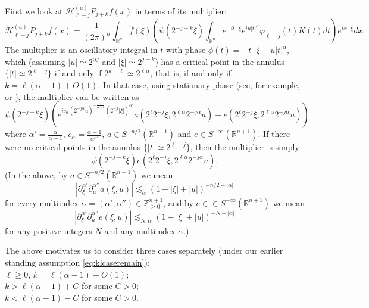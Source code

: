 \documentclass[12pt,leqno]{amsart}
\def\R{\mathbb{R}}
\theoremstyle{plain}
\numberwithin{equation}{section}
\begin{document}
First we look at $\mathcal{H}^{(u)}_{\ell-j} P_{j+k} f (x)$ in terms of its multiplier:
\[
\mathcal{H}^{(u)}_{\ell-j} P_{j+k} f (x) = \frac{1}{(2 \pi)^n} \int_{\R^n} \widehat{f}(\xi) \left(   \psi  (2^{-j-k} \xi) \int_{\R^n} e^{-i t \cdot \xi} e^{i u |t|^{\alpha}} \varphi_{\ell-j}(t) K(t) dt \right) e^{i x \cdot \xi} dx.
\] 
The multiplier is an oscillatory integral in $t$ with phase $\phi(t) = - t \cdot \xi + u |t|^{\alpha}$, which (assuming $|u| \simeq 2^{\alpha j}$ and $|\xi| \simeq 2^{j+k}$) has a critical point in the annulus $\{|t| \simeq 2^{\ell-j}\}$ if and only if $2^{k+\ell} \simeq 2^{\ell \alpha}$, that is, if and only if $k = \ell (\alpha-1) + O(1)$. In that case, using stationary phase (see, for example, \cite[Chapter VIII.5.7]{MR1232192} or \cite[Theorem 1.2.1]{MR1205579}), the multiplier can be written as
\begin{equation} \label{eq:multiplier_expansion}
\psi(2^{-j-k} \xi) \left( e^{i c_{\alpha} (2^{-j\alpha} u)^{-\frac{1}{\alpha-1}} (2^{-j} |\xi|)^{\alpha'}} a(2^{\ell} 2^{-j} \xi, 2^{\ell \alpha} 2^{-j\alpha} u) + e(2^{\ell} 2^{-j} \xi, 2^{\ell \alpha} 2^{-j\alpha} u) \right)
\end{equation} 
where $\alpha' = \frac{\alpha}{\alpha-1}$, $c_{\alpha} = \frac{\alpha-1}{\alpha^{\alpha'}}$, $a \in S^{-n/2}(\R^{n+1})$ and $e \in S^{-\infty}(\R^{n+1})$. %
If there were no critical points in the annulus $\{|t| \simeq 2^{\ell-j}\}$, then the multiplier is simply 
\begin{equation} \label{eq:multiplier_expansion2}
\psi(2^{-j-k} \xi)  e(2^{\ell} 2^{-j} \xi, 2^{\ell \alpha} 2^{-j\alpha} u).
\end{equation}  
(In the above, by $a \in S^{-n/2}(\R^{n+1})$ we mean
\[
|\partial_{\xi}^{\alpha'} \partial_u^{\alpha''} a(\xi,u)| \lesssim_{\alpha} (1+|\xi|+|u|)^{-n/2-|\alpha|}
\] 
for every multiindex $\alpha = (\alpha',\alpha'') \in \mathbb{Z}_{\geq 0}^{n+1}$, and by $e \in \in S^{-\infty}(\R^{n+1})$ we mean
\[
|\partial_{\xi}^{\alpha'} \partial_u^{\alpha''} e(\xi,u)| \lesssim_{N,\alpha} (1+|\xi|+|u|)^{-N-|\alpha|}
\] 
for any positive integers $N$ and any multiindex $\alpha$.)

The above motivates us to consider three cases separately (under our earlier standing assumption \eqref{eq:klcaseremain}): \\

 $\ell \geq 0$, $k = \ell (\alpha-1) + O(1)$;  \\ 
 $k > \ell (\alpha - 1) + C$ for some $C > 0$; \\ 
 $k < \ell (\alpha - 1) - C$ for some $C > 0$. \\
\end{document}

